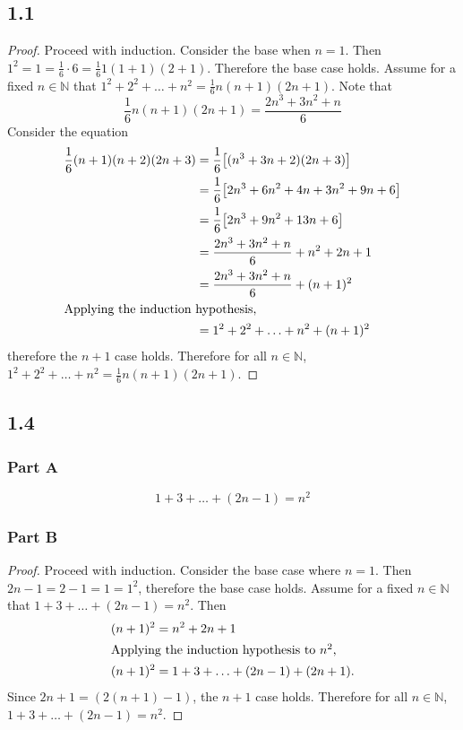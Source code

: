 \documentclass[12pt,titlepage]{extarticle}
\begin{document}
\subsection*{1.1}
\begin{proof}
	Proceed with induction. Consider the base when $n = 1$. Then $1^2 = 1 = \frac{1}{6} \cdot 6 = \frac{1}{6} 1(1+1)(2 + 1)$. Therefore the base case holds. Assume for a fixed $n \in \mathbb{N}$ that $1^2 + 2^2 + \ldots + n^2 = \frac{1}{6} n (n+1) (2n+1)$. Note that
	\[
		\frac{1}{6} n (n+1) (2n +1) = \frac{2n^3 + 3n^2 + n}{6}
	\]
	Consider the equation
	\begin{align*}
		\frac{1}{6} (n+1) (n + 2) (2n +3) &= \frac{1}{6}\qty[(n^3 + 3n + 2)(2n + 3)] \\
										  &= \frac{1}{6}\qty[2n^3 + 6n^2 + 4n + 3n^2 + 9n +6] \\
										  &= \frac{1}{6}\qty[2n^3 + 9n^2 + 13n + 6] \\
										  &= \frac{2n^3 + 3n^2 + n}{6} + n^2 + 2n + 1 \\
										  &= \frac{2n^3 + 3n^2 + n}{6} + (n+1)^2 \\
		\intertext{Applying the induction hypothesis,}
										  &= 1^2 + 2^2 + \ldots + n^2+ (n+1)^2
	\end{align*}
	therefore the $n + 1$ case holds. Therefore for all $n \in \mathbb{N}$, $1^2 + 2^2 + \ldots + n^2 = \frac{1}{6} n (n+1) (2n+1)$.
\end{proof}

\subsection*{1.4}
\subsubsection*{Part A}
\[
	1 + 3 + \ldots + (2n - 1) = n^2
\]

\subsubsection*{Part B}
\begin{proof}
	Proceed with induction. Consider the base case where $n = 1$. Then $2n - 1 = 2 - 1 = 1 = 1^2$, therefore the base case holds. Assume for a fixed $n \in \mathbb{N}$ that $1 + 3 + \ldots + (2n - 1) = n^2$. Then
	\begin{align*}
		(n+1)^2 &= n^2 + 2n + 1 \\
		\intertext{Applying the induction hypothesis to $n^2$,}
		(n+1)^2 &= 1 + 3 + \ldots + (2n - 1) + (2n + 1).
	\end{align*}
	Since $2n + 1 = (2(n+1) - 1)$, the $n+1$ case holds. Therefore for all $n \in \mathbb{N}$, $1 + 3 + \ldots + (2n-1) = n^2$.
\end{proof}
\end{document}
